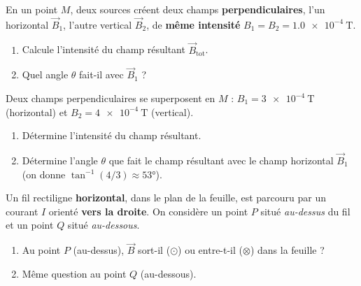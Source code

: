 \documentclass[11pt,a4paper]{article}
\newcommand{\vv}[1]{\vec{#1}}\newcommand{\ds}{\displaystyle}
\begin{document}
\begin{exo}
En un point $M$, deux sources créent deux champs \textbf{perpendiculaires}, l'un horizontal
$\vv{B}_1$, l'autre vertical $\vv{B}_2$, de \textbf{même intensité} $B_1=B_2=\qty{1.0e-4}{\tesla}$.
\begin{center}
\end{center}
\begin{enumerate}[label=\alph*)]
  \item Calcule l'intensité du champ résultant $\vv{B}_{\text{tot}}$.
  \item Quel angle $\theta$ fait-il avec $\vv{B}_1$ ?
\end{enumerate}
\end{exo}

\begin{exo}
Deux champs perpendiculaires se superposent en $M$ : $B_1=\qty{3e-4}{\tesla}$ (horizontal) et
$B_2=\qty{4e-4}{\tesla}$ (vertical).
\begin{enumerate}[label=\alph*)]
  \item Détermine l'intensité du champ résultant.
  \item Détermine l'angle $\theta$ que fait le champ résultant avec le champ horizontal $\vv{B}_1$
        (on donne $\tan^{-1}(4/3)\approx\ang{53}$).
\end{enumerate}
\end{exo}

\begin{exo}
Un fil rectiligne \textbf{horizontal}, dans le plan de la feuille, est parcouru par un courant $I$
orienté \textbf{vers la droite}. On considère un point $P$ situé \emph{au-dessus} du fil et un point
$Q$ situé \emph{au-dessous}.
\begin{center}
\end{center}
\begin{enumerate}[label=\alph*)]
  \item Au point $P$ (au-dessus), $\vv{B}$ sort-il ($\odot$) ou entre-t-il ($\otimes$) dans la feuille ?
  \item Même question au point $Q$ (au-dessous).
\end{enumerate}
\end{exo}
\end{document}
